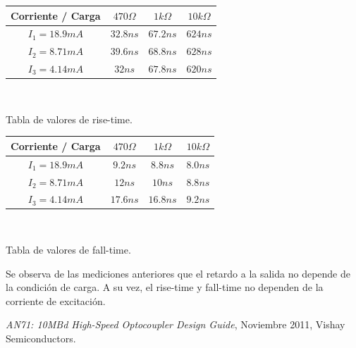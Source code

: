 \documentclass[12pt,a4paper]{article}
\begin{document}
{\centering
\begin{tabular}{| c | c | c | c |} \hline
Corriente / Carga & $470\Omega$ & $1k\Omega$ & $10k\Omega$ \\ \hline
$I_1=18.9mA$ & $32.8ns$ & $67.2ns$ & $624ns$ \\ \hline 
$I_2=8.71mA$ & $39.6ns$ & $68.8ns$ & $628ns$ \\ \hline 
$I_3=4.14mA$ & $32ns$ & $67.8ns$ & $620ns$ \\ \hline 
\end{tabular}\\}
{\centering Tabla de valores de rise-time.\\}

{\centering
\begin{tabular}{| c | c | c | c |} \hline
Corriente / Carga & $470\Omega$ & $1k\Omega$ & $10k\Omega$ \\ \hline
$I_1=18.9mA$ & $9.2ns$ & $8.8ns$ & $8.0ns$ \\ \hline 
$I_2=8.71mA$ & $12ns$ & $10ns$ & $8.8ns$ \\ \hline 
$I_3=4.14mA$ & $17.6ns$ & $16.8ns$ & $9.2ns$ \\ \hline 
\end{tabular}\\}
{\centering Tabla de valores de fall-time.\\}

Se observa de las mediciones anteriores que el retardo a la salida no depende de la condición de carga. A su vez, el rise-time y fall-time no dependen de la corriente de excitación.\\

\newpage
\begin{thebibliography}{1}
\textit{AN71: 10MBd High-Speed Optocoupler Design Guide}, Noviembre 2011, Vishay Semiconductors.
\end{thebibliography}
\end{document}

